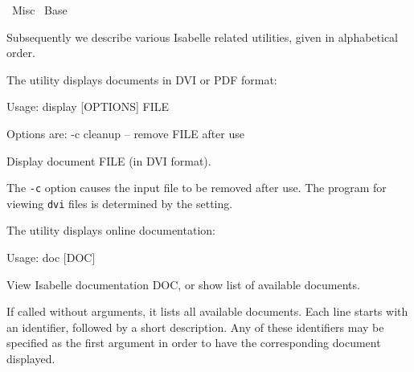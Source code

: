 %
\begin{isabellebody}%
\def\isabellecontext{Misc}%
%
\isadelimtheory
%
\endisadelimtheory
%
\isatagtheory
{}\isamarkupfalse%
\ Misc\isanewline
{}\ Base\isanewline
{}%
\endisatagtheory
{\isafoldtheory}%
%
\isadelimtheory
%
\endisadelimtheory
%
\isamarkuptrue%
%
\begin{isamarkuptext}%
Subsequently we describe various Isabelle related utilities, given
  in alphabetical order.%
\end{isamarkuptext}%
\isamarkuptrue%
%
\isamarkuptrue%
%
\begin{isamarkuptext}%
The \hypertarget{tool.display}{\hyperlink{tool.display}{\mbox{}}} utility displays documents in DVI or PDF
  format:
\begin{ttbox}
Usage: display [OPTIONS] FILE

  Options are:
    -c           cleanup -- remove FILE after use

  Display document FILE (in DVI format).
\end{ttbox}

  \medskip The \verb|-c| option causes the input file to be
  removed after use.  The program for viewing \verb|dvi| files is
  determined by the \hyperlink{setting.DVI-VIEWER}{\mbox{}} setting.%
\end{isamarkuptext}%
\isamarkuptrue%
%
\isamarkuptrue%
%
\begin{isamarkuptext}%
The \hypertarget{tool.doc}{\hyperlink{tool.doc}{\mbox{}}} utility displays online documentation:
\begin{ttbox}
Usage: doc [DOC]

  View Isabelle documentation DOC, or show list of available documents.
\end{ttbox}
  If called without arguments, it lists all available documents. Each
  line starts with an identifier, followed by a short description. Any
  of these identifiers may be specified as the first argument in order
  to have the corresponding document displayed.


\end{isamarkuptext}
\end{isabellebody}
